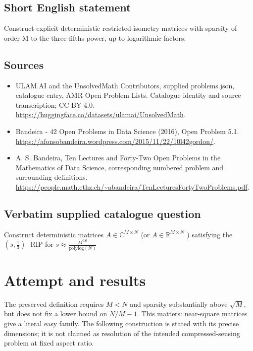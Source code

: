 \documentclass[11pt]{article}
\begin{document}
\subsection{Short English statement}
Construct explicit deterministic restricted-isometry matrices with sparsity of order M to the three-fifths power, up to logarithmic factors.
\subsection{Sources}
\begin{itemize}
\item[S1] ULAM.AI and the UnsolvedMath Contributors, supplied problems.json, catalogue entry, AMR Open Problem Lists. Catalogue identity and source transcription; CC BY 4.0.
\url{https://huggingface.co/datasets/ulamai/UnsolvedMath}.
\item[S2] Bandeira - 42 Open Problems in Data Science (2016), Open Problem 5.1. 
\url{https://afonsobandeira.wordpress.com/2015/11/22/10l42gordon/}.
\item[S3] A. S. Bandeira, Ten Lectures and Forty-Two Open Problems in the Mathematics of Data Science, corresponding numbered problem and surrounding definitions.
\url{https://people.math.ethz.ch/~abandeira/TenLecturesFortyTwoProblems.pdf}.
\end{itemize}
\subsection{Verbatim supplied catalogue question}
Construct deterministic matrices $A\in\mathbb{C}^{M\times N}$ (or $A\in\mathbb{R}^{M\times N}$ ) satisfying the $(s,\frac13)$ -RIP for $s\approx\frac{M^{0.6}}{\mathrm{polylog}(N)}$

\section{Attempt and results}
The preserved definition requires $M<N$ and sparsity substantially above
$\sqrt M$, but does not fix a lower bound on $N/M-1$. This matters:
near-square matrices give a literal easy family. The following construction
is stated with its precise dimensions; it is not claimed as resolution of
the intended compressed-sensing problem at fixed aspect ratio.
\end{document}
